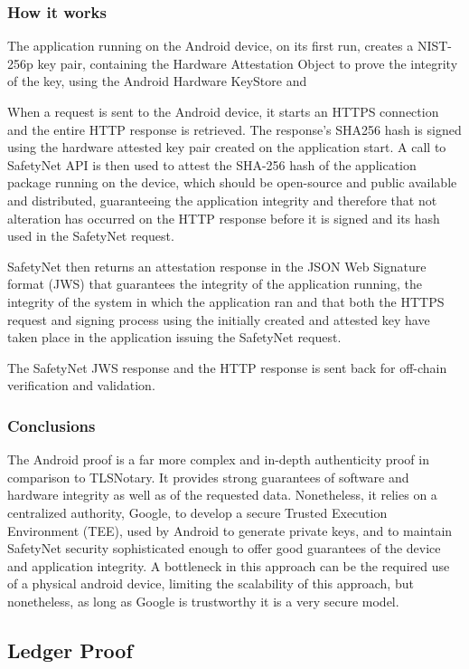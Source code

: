 \subsubsection{How it works}
The application running on the Android device, on its first run, creates a NIST-256p key pair, containing the Hardware Attestation Object to prove the integrity of the key, using the Android Hardware KeyStore and 

When a request is sent to the Android device, it starts an HTTPS connection and the entire HTTP response is retrieved. The response's SHA256 hash is signed using the hardware attested key pair created on the application start. A call to SafetyNet API is then used to attest the SHA-256 hash of the application package running on the device, which should be open-source and public available and distributed, guaranteeing the application integrity and therefore that not alteration has occurred on the HTTP response before it is signed and its hash used in the SafetyNet request.

SafetyNet then returns an attestation response in the JSON Web Signature format (JWS) that guarantees the integrity of the application running, the integrity of the system in which the application ran and that both the HTTPS request and signing process using the initially created and attested key have taken place in the application issuing the SafetyNet request.

The SafetyNet JWS response and the HTTP response is sent back for off-chain verification and validation.

\subsubsection{Conclusions}
The Android proof is a far more complex and in-depth authenticity proof in comparison to TLSNotary. It provides strong guarantees of software and hardware integrity as well as of the requested data. Nonetheless, it relies on a centralized authority, Google, to develop a secure Trusted Execution Environment (TEE), used by Android to generate private keys, and to maintain SafetyNet security sophisticated enough to offer good guarantees of the device and application integrity. A bottleneck in this approach can be the required use of a physical android device, limiting the scalability of this approach, but nonetheless, as long as Google is trustworthy it is a very secure model. 

\subsection{Ledger Proof}


